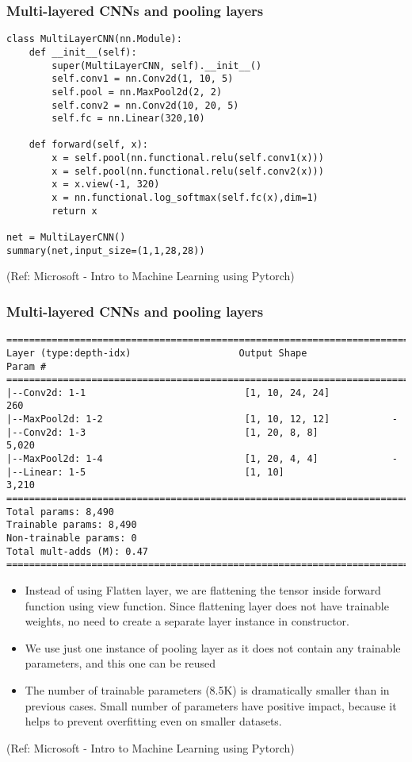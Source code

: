 \begin{frame}[fragile] \frametitle{Multi-layered CNNs and pooling layers}

\begin{lstlisting}
class MultiLayerCNN(nn.Module):
    def __init__(self):
        super(MultiLayerCNN, self).__init__()
        self.conv1 = nn.Conv2d(1, 10, 5)
        self.pool = nn.MaxPool2d(2, 2)
        self.conv2 = nn.Conv2d(10, 20, 5)
        self.fc = nn.Linear(320,10)

    def forward(self, x):
        x = self.pool(nn.functional.relu(self.conv1(x)))
        x = self.pool(nn.functional.relu(self.conv2(x)))
        x = x.view(-1, 320)
        x = nn.functional.log_softmax(self.fc(x),dim=1)
        return x

net = MultiLayerCNN()
summary(net,input_size=(1,1,28,28))
\end{lstlisting}

\tiny{(Ref: Microsoft - Intro to Machine Learning using Pytorch)}
\end{frame}

\begin{frame}[fragile] \frametitle{Multi-layered CNNs and pooling layers}

\begin{lstlisting}
==========================================================================
Layer (type:depth-idx)                   Output Shape              Param #
==========================================================================
|--Conv2d: 1-1                            [1, 10, 24, 24]           260
|--MaxPool2d: 1-2                         [1, 10, 12, 12]           -
|--Conv2d: 1-3                            [1, 20, 8, 8]             5,020
|--MaxPool2d: 1-4                         [1, 20, 4, 4]             -
|--Linear: 1-5                            [1, 10]                   3,210
==========================================================================
Total params: 8,490
Trainable params: 8,490
Non-trainable params: 0
Total mult-adds (M): 0.47
==========================================================================
\end{lstlisting}

\begin{itemize}

\item Instead of using Flatten layer, we are flattening the tensor inside forward function using view function. Since flattening layer does not have trainable weights, no need to create a separate layer instance in constructor.
\item We use just one instance of pooling layer as it does not contain any trainable parameters, and this one can be reused
\item The number of trainable parameters (8.5K) is dramatically smaller than in previous cases. Small number of parameters have positive impact, because it helps to prevent overfitting even on smaller datasets.
\end{itemize}


\tiny{(Ref: Microsoft - Intro to Machine Learning using Pytorch)}
\end{frame}

